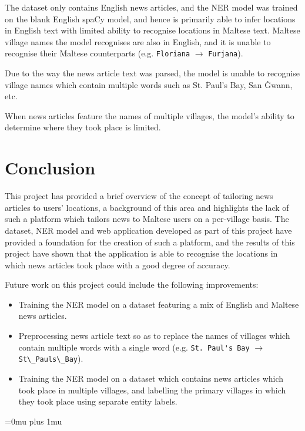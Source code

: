 \documentclass[a4paper, oneside, 11pt]{article}
\begin{document}
\begin{multicols*}{2}
  The dataset only contains English news articles, and the NER model was trained on the blank English spaCy model, and hence is primarily able to infer locations in English text with limited ability to recognise locations in Maltese text. Maltese village names the model recognises are also in English, and it is unable to recognise their Maltese counterparts (e.g. \verb|Floriana| $\rightarrow$ \verb|Furjana|).

  Due to the way the news article text was parsed, the model is unable to recognise village names which contain multiple words such as St. Paul's Bay, San Ġwann, etc.

  When news articles feature the names of multiple villages, the model's ability to determine where they took place is limited.

  \section{Conclusion}
  This project has provided a brief overview of the concept of tailoring news articles to users' locations, a background of this area and highlights the lack of such a platform which tailors news to Maltese users on a per-village basis. The dataset, NER model and web application developed as part of this project have provided a foundation for the creation of such a platform, and the results of this project have shown that the application is able to recognise the locations in which news articles took place with a good degree of accuracy.

  Future work on this project could include the following improvements:
  \begin{itemize}
    \item Training the NER model on a dataset featuring a mix of English and Maltese news articles.
    \item Preprocessing news article text so as to replace the names of villages which contain multiple words with a single word (e.g. \verb|St. Paul's Bay| $\rightarrow$ \verb|St\_Pauls\_Bay|).
    \item Training the NER model on a dataset which contains news articles which took place in multiple villages, and labelling the primary villages in which they took place using separate entity labels.
  \end{itemize}





  \newpage


  \Urlmuskip=0mu plus 1mu\relax
  
  

\end{multicols*}
\end{document}
